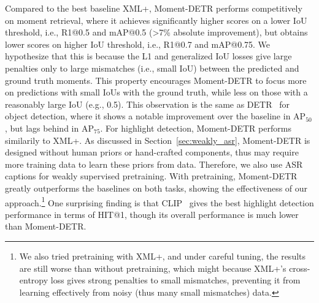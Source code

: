 Compared to the best baseline XML+, Moment-DETR performs competitively on moment retrieval, where it achieves significantly higher scores on a lower IoU threshold, i.e., R1@0.5 and mAP@0.5 (>7\% absolute improvement), but obtains lower scores on higher IoU threshold, i.e., R1@0.7 and mAP@0.75.
We hypothesize that this is because the L1 and generalized IoU losses give large penalties only to large mismatches (i.e., small IoU) between the predicted and ground truth moments.
This property encourages Moment-DETR to focus more on predictions with small IoUs with the ground truth, while less on those with a reasonably large IoU (e.g., 0.5).
This observation is the same as DETR~\cite{carion2020end} for object detection, where it shows a notable improvement over the baseline in AP$_{50}$, but lags behind in AP$_{75}$.
For highlight detection, Moment-DETR performs similarily to XML+.
As discussed in Section~\ref{sec:weakly_asr}, Moment-DETR is designed without human priors or hand-crafted components, thus may require more training data to learn these priors from data.
Therefore, we also use ASR captions for weakly supervised pretraining.
With pretraining, Moment-DETR greatly outperforms the baselines on both tasks, showing the effectiveness of our approach.\footnote{We also tried pretraining with XML+, and under careful tuning, the results are still worse than without pretraining, which might because XML+'s cross-entropy loss gives strong penalties to small mismatches, preventing it from learning effectively from noisy (thus many small mismatches) data.} 
One surprising finding is that CLIP~\cite{radford2021learning} gives the best highlight detection performance in terms of HIT@1, though its overall performance is much lower than Moment-DETR.



\begin{table}[t!]
\setlength{\tabcolsep}{0.2em}
\small
\centering
\caption{Loss ablations on \DatasetName~\textit{val} split. 
All models are trained from scratch.}
\label{tab:loss_ablation}
\end{table}




